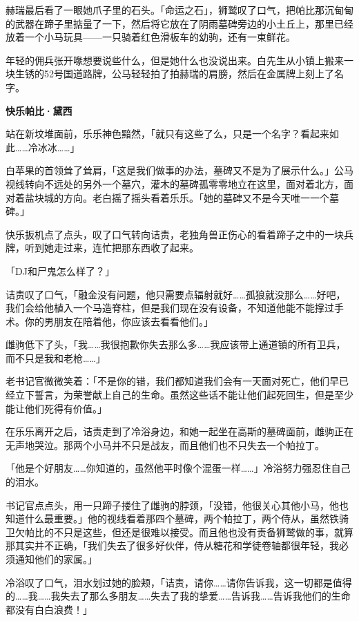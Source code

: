 赫瑞最后看了一眼她爪子里的石头。「命运之石」，狮鹫叹了口气，把帕比那沉甸甸的武器在蹄子里掂量了一下，然后将它放在了阴雨墓碑旁边的小土丘上，那里已经放着一个小马玩具——一只骑着红色滑板车的幼驹，还有一束鲜花。

年轻的佣兵张开喙想要说些什么，但是她什么也没说出来。白先生从小镇上搬来一块生锈的52号国道路牌，公马轻轻拍了拍赫瑞的肩膀，然后在金属牌上刻上了名字。

\begin{center}
    \textbf{快乐帕比·黛西}
\end{center}

站在新坟堆面前，乐乐神色黯然，「就只有这些了么，只是一个名字？看起来如此……冷冰冰……」

白苹果的首领耸了耸肩，「这是我们做事的办法，墓碑又不是为了展示什么。」公马视线转向不远处的另外一个墓穴，灌木的墓碑孤零零地立在这里，面对着北方，面对着盐块城的方向。老白摇了摇头看着乐乐。「她的墓碑又不是今天唯一一个墓碑。」

快乐扳机点了点头，叹了口气转向诘责，老独角兽正伤心的看着蹄子之中的一块兵牌，听到她走过来，连忙把那东西收了起来。

「DJ和尸鬼怎么样了？」

诘责叹了口气，「融金没有问题，他只需要点辐射就好……孤狼就没那么……好吧，我们会给他植入一个马造脊柱，但是我们现在没有设备，不知道他能不能撑过手术。你的男朋友在陪着他，你应该去看看他们。」

雌驹低下了头，「我……我很抱歉你失去那么多……我应该带上通道镇的所有卫兵，而不只是我和老枪……」

老书记官微微笑着：「不是你的错，我们都知道我们会有一天面对死亡，他们早已经立下誓言，为荣誉献上自己的生命。虽然这些话不能让他们起死回生，但是至少能让他们死得有价值。」

在乐乐离开之后，诘责走到了冷浴身边，和她一起坐在高斯的墓碑面前，雌驹正在无声地哭泣。那两个小马并不只是战友，而且他们也不只失去一个帕拉丁。

「他是个好朋友……你知道的，虽然他平时像个混蛋一样……」冷浴努力强忍住自己的泪水。

书记官点点头，用一只蹄子搂住了雌驹的脖颈，「没错，他很关心其他小马，他也知道什么最重要。」他的视线看着那四个墓碑，两个帕拉丁，两个侍从，虽然铁骑卫欠帕比的不只是这些，但还是很难以接受。而且他也没有责备狮鹫做的事，就算那其实并不正确，「我们失去了很多好伙伴，侍从糖花和学徒卷轴都很年轻，我必须通知他们的家属。」

冷浴叹了口气，泪水划过她的脸颊，「诘责，请你……请你告诉我，这一切都是值得的……我……我失去了那么多朋友……失去了我的挚爱……告诉我……告诉我他们的生命都没有白白浪费！」

